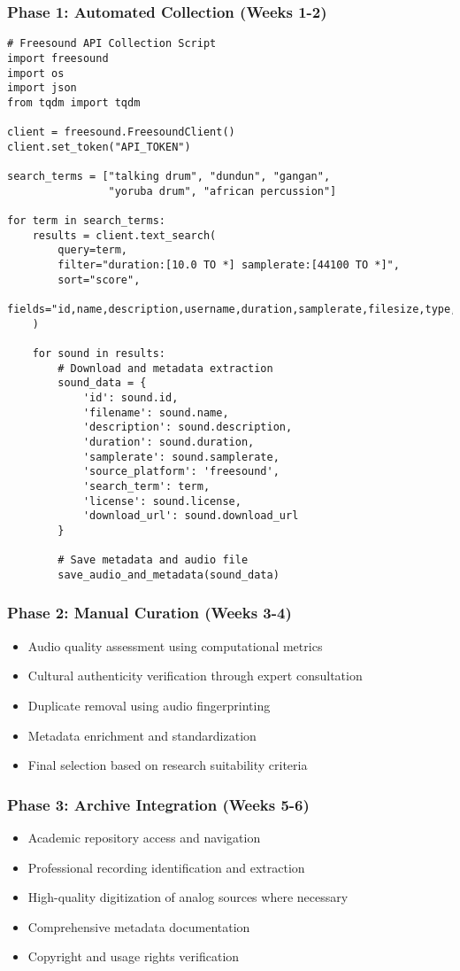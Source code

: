 \documentclass[12pt]{article}
\begin{document}
\subsubsection{Phase 1: Automated Collection (Weeks 1-2)}
\begin{verbatim}
# Freesound API Collection Script
import freesound
import os
import json
from tqdm import tqdm

client = freesound.FreesoundClient()
client.set_token("API_TOKEN")

search_terms = ["talking drum", "dundun", "gangan", 
                "yoruba drum", "african percussion"]

for term in search_terms:
    results = client.text_search(
        query=term,
        filter="duration:[10.0 TO *] samplerate:[44100 TO *]",
        sort="score",
        fields="id,name,description,username,duration,samplerate,filesize,type,channels,license"
    )
    
    for sound in results:
        # Download and metadata extraction
        sound_data = {
            'id': sound.id,
            'filename': sound.name,
            'description': sound.description,
            'duration': sound.duration,
            'samplerate': sound.samplerate,
            'source_platform': 'freesound',
            'search_term': term,
            'license': sound.license,
            'download_url': sound.download_url
        }
        
        # Save metadata and audio file
        save_audio_and_metadata(sound_data)
\end{verbatim}

\subsubsection{Phase 2: Manual Curation (Weeks 3-4)}
\begin{itemize}
    \item Audio quality assessment using computational metrics
    \item Cultural authenticity verification through expert consultation
    \item Duplicate removal using audio fingerprinting
    \item Metadata enrichment and standardization
    \item Final selection based on research suitability criteria
\end{itemize}

\subsubsection{Phase 3: Archive Integration (Weeks 5-6)}
\begin{itemize}
    \item Academic repository access and navigation
    \item Professional recording identification and extraction
    \item High-quality digitization of analog sources where necessary
    \item Comprehensive metadata documentation
    \item Copyright and usage rights verification
\end{itemize}
\end{document}
